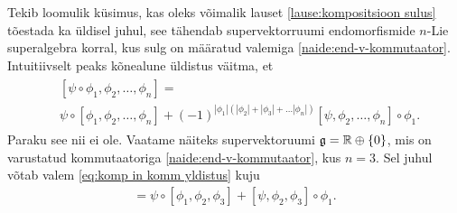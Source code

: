 \begin{markus}
    Tekib loomulik küsimus, kas oleks võimalik lauset
    \ref{lause:kompositsioon sulus} tõestada ka üldisel juhul,
    see tähendab supervektorruumi endomorfismide
    $n$-Lie superalgebra korral, kus sulg on määratud valemiga
    \eqref{naide:end-v-kommutaator}. Intuitiivselt peaks kõnealune
    üldistus väitma, et
    \begin{align}\label{eq:komp in komm yldistus}
        \begin{split}
            &[\psi \circ \phi_1, \phi_2, \dots, \phi_n] = \\
            &\psi \circ [\phi_1, \phi_2, \dots, \phi_n] +
            (-1)^{|\phi_1| \left(
                |\phi_2| + |\phi_3| + \dots |\phi_n|
            \right)}
            [\psi, \phi_2, \dots, \phi_n] \circ \phi_1.
        \end{split}
    \end{align}
    Paraku see nii ei ole. Vaatame näiteks supervektoruumi
    $\mathfrak{g} = \mathbb{R} \oplus \{0\}$, mis on varustatud kommutaatoriga
    \eqref{naide:end-v-kommutaator}, kus $n = 3$.
    Sel juhul võtab valem \eqref{eq:komp in komm yldistus} kuju
    \begin{align*}
        [\psi \circ \phi_1, \phi_2, \phi_3] =
        \psi \circ [\phi_1, \phi_2, \phi_3] +
        [\psi, \phi_2, \phi_3] \circ \phi_1.
    \end{align*}


\end{markus}
